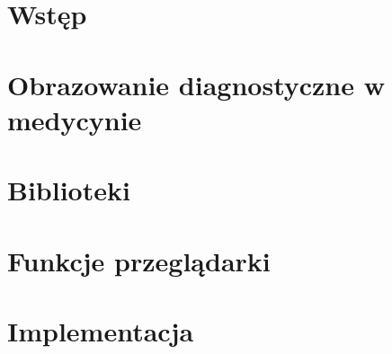 \chapter{Wstęp}


\chapter{Obrazowanie diagnostyczne w medycynie}



\chapter{Biblioteki}

\chapter{Funkcje przeglądarki}

\chapter{Implementacja}

